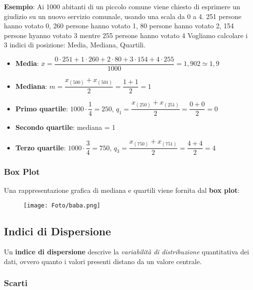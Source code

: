 \begin{tcolorbox}
    \textbf{Esempio}: Ai 1000 abitanti di un piccolo comune viene chiesto di esprimere un giudizio su un nuovo servizio comunale, usando una scala da 0 a 4. 251 persone hanno votato 0, 260 persone hanno votato 1, 80 persone hanno votato 2, 154 persone hyanno votato 3 mentre 255 persone hanno votato 4\newline
    Vogliamo calcolare i 3 indici di posizione: Media, Mediana, Quartili. \newline
    \begin{itemize}
        \item \textbf{Media}: $\overline{x} = \dfrac{0 \cdot 251 + 1 \cdot 260 + 2 \cdot 80 + 3 \cdot 154 + 4 \cdot 255}{1000}= 1,902 \simeq 1,9$
        \item \textbf{Mediana}: $m = \dfrac{x_{(500)} + x_{(501)}}{2} = \dfrac{1+1}{2}= 1$
        \item \textbf{Primo quartile}: $1000 \cdot \dfrac{1}{4} = 250 $, $q_1 = \dfrac{x_{(250)} + x_{(251)}}{2} = \dfrac{0+0}{2}=0$
        \item \textbf{Secondo quartile}: mediana = 1
        \item \textbf{Terzo quartile}: $ 1000 \cdot \dfrac{3}{4} = 750 $, $q_3 = \dfrac{x_{(750)} + x_{(751)}}{2} = \dfrac{4+4}{2}=4$
    \end{itemize}
\end{tcolorbox} 

\subsubsection{Box Plot}

Una rappresentazione grafica di mediana e quartili viene fornita dal \textbf{box plot}:
\begin{figure}[h!]
    \centering
    \texttt{[image: Foto/baba.png]}
\end{figure}

\subsection{Indici di Dispersione}

Un \textbf{indice di dispersione} descrive la \textit{variabilità di distribuzione} quantitativa dei dati, ovvero quanto i valori presenti distano da un valore centrale.  

\subsubsection{Scarti}

